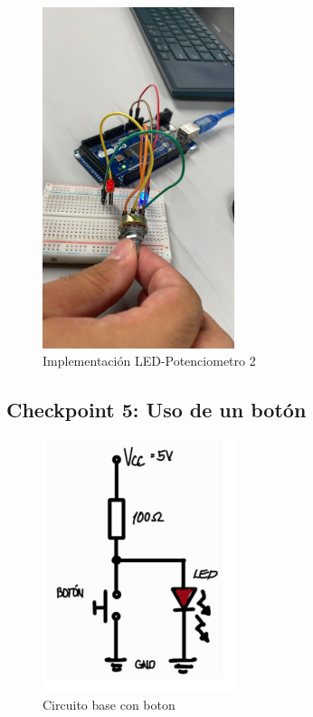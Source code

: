 \documentclass{article}
\begin{document}
\begin{figure}[H]
    \centering
    \includegraphics[width=0.50\textwidth]{./img/chkp-3-4-1.jpeg}
    \caption{Implementación LED-Potenciometro 2}
    \label{fig:simulacion_esquema6}
\end{figure}

\subsection{Checkpoint 5: Uso de un botón}

\begin{figure}[H]
    \centering
    \includegraphics[width=0.50\textwidth]{./img/Circuito-boton.png}
    \caption{Circuito base con boton}
    \label{fig:simulacion_esquema7}
\end{figure}
\end{document}
